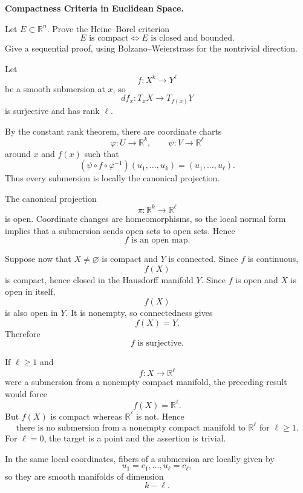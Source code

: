 \begin{problem}[CP-II-0321]
\label{prob:cp-ii-0321}
\textbf{Compactness Criteria in Euclidean Space.}

\hspace*{1.5em}Let \(E\subset\mathbb R^n\). Prove the Heine--Borel criterion
\[
\boxed{E\text{ is compact}\iff E\text{ is closed and bounded}.}
\]
Give a sequential proof, using Bolzano--Weierstrass for the nontrivial
direction.
\end{problem}

\begin{solution}
Let
\[
f:X^k\to Y^\ell
\]
be a smooth submersion at \(x\), so
\[
df_x:T_xX\to T_{f(x)}Y
\]
is surjective and has rank \(\ell\).

By the constant rank theorem, there are coordinate charts
\[
\varphi:U\to\mathbb R^k,
\qquad
\psi:V\to\mathbb R^\ell
\]
around \(x\) and \(f(x)\) such that
\[
\boxed{
(\psi\circ f\circ\varphi^{-1})
(u_1,\ldots,u_k)
=
(u_1,\ldots,u_\ell).
}
\]
Thus every submersion is locally the canonical projection.

The canonical projection
\[
\pi:\mathbb R^k\to\mathbb R^\ell
\]
is open. Coordinate changes are homeomorphisms, so the local normal form implies that a submersion sends open sets to open sets. Hence
\[
\boxed{f\text{ is an open map}.}
\]

Suppose now that \(X\neq\varnothing\) is compact and \(Y\) is connected. Since \(f\) is continuous,
\[
f(X)
\]
is compact, hence closed in the Hausdorff manifold \(Y\). Since \(f\) is open and \(X\) is open in itself,
\[
f(X)
\]
is also open in \(Y\). It is nonempty, so connectedness gives
\[
f(X)=Y.
\]
Therefore
\[
\boxed{f\text{ is surjective}.}
\]

If \(\ell\ge1\) and
\[
f:X\to\mathbb R^\ell
\]
were a submersion from a nonempty compact manifold, the preceding result would force
\[
f(X)=\mathbb R^\ell.
\]
But \(f(X)\) is compact whereas \(\mathbb R^\ell\) is not. Hence
\[
\boxed{
\text{there is no submersion from a nonempty compact manifold to }
\mathbb R^\ell
\text{ for }\ell\ge1.
}
\]
For \(\ell=0\), the target is a point and the assertion is trivial.

In the same local coordinates, fibers of a submersion are locally given by
\[
u_1=c_1,\ldots,u_\ell=c_\ell,
\]
so they are smooth manifolds of dimension
\[
k-\ell.
\]
\end{solution}


